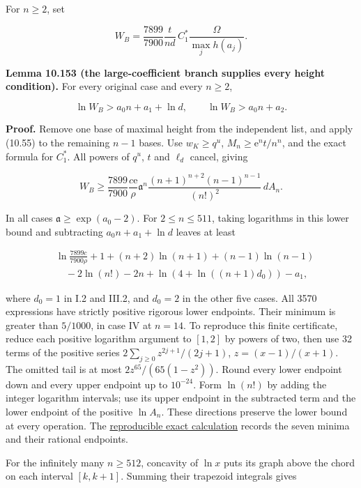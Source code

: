 \documentclass[
  11pt,
  a4paper,
]{article}
\begin{document}
For \(n\ge2\), set

\[
W_B=\frac{7899}{7900}\frac{t}{nd}\,
       C_1^*\frac{\Omega}{\max_jh(a_j)}.
\tag{10.457}
\]

\textbf{Lemma 10.153 (the large-coefficient branch supplies every height
condition).} For every original case and every \(n\ge2\),

\[
\ln W_B>a_0n+a_1+\ln d,
\qquad \ln W_B>a_0n+a_2.
\tag{10.458}
\]

\textbf{Proof.} Remove one base of maximal height from the independent
list, and apply (10.55) to the remaining \(n-1\) bases. Use
\(w_K\ge q^u\), \(M_n\ge\mathrm e^nt/n^n\), and the exact formula for
\(C_1^*\). All powers of \(q^u\), \(t\) and \(\ell_d\) cancel, giving

\[
W_B\ge\frac{7899}{7900}\frac{c\mathrm e}{\rho}
\mathfrak a^n
\frac{(n+1)^{n+2}(n-1)^{n-1}}{(n!)^2}\,dA_n.
\tag{10.459}
\]

In all cases \(\mathfrak a\ge\exp(a_0-2)\). For \(2\le n\le511\), taking
logarithms in this lower bound and subtracting \(a_0n+a_1+\ln d\) leaves
at least

\[
\begin{aligned}
&\ln\frac{7899c}{7900\rho}+1
 +(n+2)\ln(n+1)+(n-1)\ln(n-1)\\
&\quad{}-2\ln(n!)-2n+\ln(4+\ln((n+1)d_0))-a_1,
\end{aligned}
\tag{10.460}
\]

where \(d_0=1\) in I.2 and III.2, and \(d_0=2\) in the other five cases.
All 3570 expressions have strictly positive rigorous lower endpoints.
Their minimum is greater than \(5/1000\), in case IV at \(n=14\). To
reproduce this finite certificate, reduce each positive logarithm
argument to \([1,2]\) by powers of two, then use 32 terms of the
positive series \(2\sum_{j\ge0}z^{2j+1}/(2j+1)\), \(z=(x-1)/(x+1)\). The
omitted tail is at most \(2z^{65}/(65(1-z^2))\). Round every lower
endpoint down and every upper endpoint up to \(10^{-24}\). Form
\(\ln(n!)\) by adding the integer logarithm intervals; use its upper
endpoint in the subtracted term and the lower endpoint of the positive
\(\ln A_n\). These directions preserve the lower bound at every
operation. The
\href{../figure_sources/yu_application_height_certificate.py}{reproducible
exact calculation} records the seven minima and their rational
endpoints.

For the infinitely many \(n\ge512\), concavity of \(\ln x\) puts its
graph above the chord on each interval \([k,k+1]\). Summing their
trapezoid integrals gives
\end{document}
